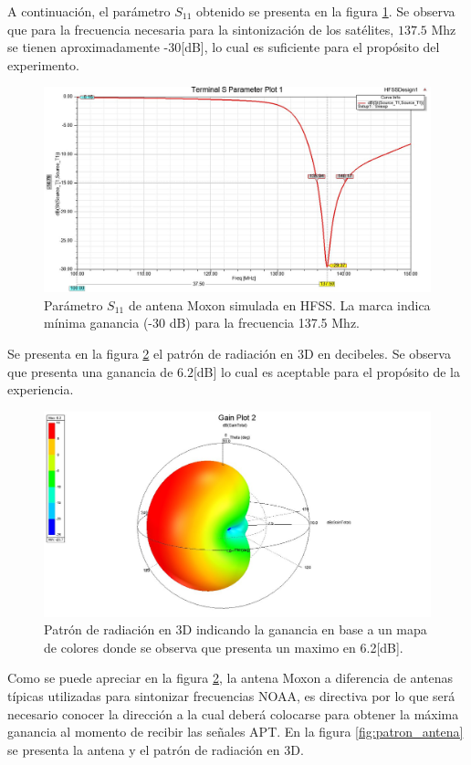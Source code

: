 A continuación, el parámetro $S_{11}$ obtenido se presenta en la figura \ref{fig:hfss_s11}. Se observa que para la frecuencia necesaria para la sintonización de los satélites, $137.5$ Mhz se tienen aproximadamente -30[dB], lo cual es suficiente para el propósito del experimento.

\begin{figure}[H]
    \centering
    \includegraphics[width=0.7\linewidth]{img/s11.jpg}
        \caption{Parámetro $S_{11}$ de antena Moxon simulada en HFSS. La marca indica mínima ganancia (-30 dB) para la frecuencia 137.5 Mhz.}
    \label{fig:hfss_s11}
\end{figure}

Se presenta en la figura \ref{fig:gain3D} el patrón de radiación en 3D en decibeles. Se observa que presenta una ganancia de $6.2$[dB] lo cual es aceptable para el propósito de la experiencia.
\begin{figure}[H]
    \centering
    \includegraphics[width=0.7\linewidth]{img/Gain.jpg}
    \caption{Patrón de radiación en 3D indicando la ganancia en base a un mapa de colores donde se observa que presenta un maximo en 6.2[dB].}
    \label{fig:gain3D}
\end{figure}

Como se puede apreciar en la figura \ref{fig:gain3D}, la antena Moxon a diferencia de antenas típicas utilizadas para sintonizar frecuencias NOAA, es directiva por lo que será necesario conocer la dirección a la cual deberá colocarse para obtener la máxima ganancia al momento de recibir las señales APT. En la figura \ref{fig:patron_antena} se presenta la antena y el patrón de radiación en 3D.

